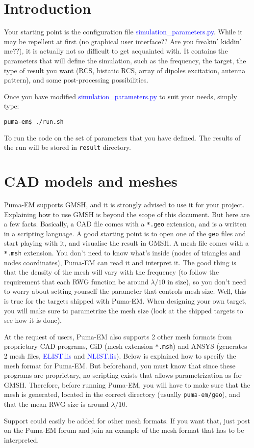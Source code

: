 \documentclass[a4paper,10pt]{book}
\newcommand{\file}[1] {\textcolor{blue}{\textsf{#1}}}
\begin{document}
\section{Introduction}
%
\par
Your starting point is the configuration file \file{simulation\_parameters.py}. While it may be repellent at first (no graphical user interface?? Are you freakin' kiddin' me??), it is actually not so difficult to get acquainted with. It contains the parameters that will define the simulation, such as the frequency, the target, the type of result you want (RCS, bistatic RCS, array of dipoles excitation, antenna pattern), and some post-processing possibilities. 
%
\par
Once you have modified \file{simulation\_parameters.py} to suit your needs, simply type:
\begin{verbatim}
puma-em$ ./run.sh
\end{verbatim}
To run the code on the set of parameters that you have defined. The results of the run will be stored in \texttt{result} directory.

\section{CAD models and meshes}
%
\par
Puma-EM supports GMSH, and it is strongly advised to use it for your project. Explaining how to use GMSH is beyond the scope of this document. But here are a few facts. Basically, a CAD file comes with a \texttt{*.geo} extension, and is a written in a scripting language. A good starting point is to open one of the \texttt{geo} files and start playing with it, and visualise the result in GMSH. A mesh file comes with a \texttt{*.msh} extension. You don't need to know what's inside (nodes of triangles and nodes coordinates), Puma-EM can read it and interpret it. The good thing is that the density of the mesh will vary with the frequency (to follow the requirement that each RWG function be around $\lambda/10$ in size), so you don't need to worry about setting yourself the parameter that controls mesh size. Well, this is true for the targets shipped with Puma-EM. When designing your own target, you will make sure to parametrize the mesh size (look at the shipped targets to see how it is done).
%
\par
At the request of users, Puma-EM also supports 2 other mesh formats from proprietary CAD programs, GiD (mesh extension \texttt{*.msh}) and ANSYS (generates 2 mesh files, \file{ELIST.lis} and \file{NLIST.lis}). Below is explained how to specify the mesh format for Puma-EM. But beforehand, you must know that since these programs are proprietary, no scripting exists that allows parametrization as for GMSH. Therefore, before running Puma-EM, you will have to make sure that the mesh is generated, located in the correct directory (usually \texttt{puma-em/geo}), and that the mean RWG size is around $\lambda/10$.
%
\par
Support could easily be added for other mesh formats. If you want that, just post on the Puma-EM forum and join an example of the mesh format that has to be interpreted.
\end{document}
